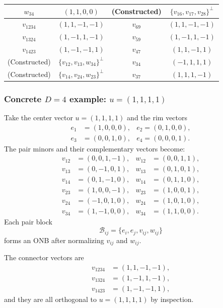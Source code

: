 \documentclass[%
  reprint,
  superscriptaddress,
  showpacs,
  showkeys,
  amsmath,amssymb,
  pra,
  longbibliography,
  floatfix,
  x11names
]{revtex4-2}
\begin{document}
\begin{table}[ht]
\begin{ruledtabular}
\begin{tabular}{cccc}
$w_{34}$ & $(1,1,0,0)$ & (Constructed) & $\{v_{16}, v_{17}, v_{28}\}^\perp$ \\
\hline
$v_{1234}$ & $(1,1,-1,-1)$ & $v_{69}$ & $(1,1,-1,-1)$ \\
$v_{1324}$ & $(1,-1,1,-1)$ & $v_{59}$ & $(1,-1,1,-1)$ \\
$v_{1423}$ & $(1,-1,-1,1)$ & $v_{47}$ & $(1,1,-1,1)$ \\
\hline
(Constructed) & $\{v_{12}, v_{13}, w_{34}\}^\perp$ & $v_{34}$ & $(-1,1,1,1)$ \\
(Constructed) & $\{v_{14}, v_{24}, w_{23}\}^\perp$ & $v_{37}$ & $(1,1,1,-1)$ \\
\end{tabular}
\end{ruledtabular}
\end{table}





\subsubsection{Concrete $D=4$ example: $u=(1,1,1,1)$}

Take the center vector $u=(1,1,1,1)$ and the rim vectors
\begin{align*}
e_1&=(1,0,0,0),& e_2 =(0,1,0,0),\\
e_3&=(0,0,1,0),& e_4 =(0,0,0,1).
\end{align*}
The pair minors and their complementary vectors become:
\begin{align*}
v_{12}&=(0,0,1,-1), & w_{12}&=(0,0,1,1),\\
v_{13}&=(0,-1,0,1), & w_{13}&=(0,1,0,1),\\
v_{14}&=(0,1,-1,0), & w_{14}&=(0,1,1,0),\\
v_{23}&=(1,0,0,-1), & w_{23}&=(1,0,0,1),\\
v_{24}&=(-1,0,1,0), & w_{24}&=(1,0,1,0),\\
v_{34}&=(1,-1,0,0), & w_{34}&=(1,1,0,0).
\end{align*}
Each pair block
\[
\mathcal{B}_{ij}=\{e_i, e_j, v_{ij}, w_{ij}\}
\]
forms an ONB after normalizing $v_{ij}$ and $w_{ij}$.

The connector vectors are
\begin{align*}
v_{1234}&=(1,1,-1,-1),\\
v_{1324}& =(1,-1,1,-1),\\
v_{1423}&=(1,-1,-1,1),
\end{align*}
and they are all orthogonal to $u=(1,1,1,1)$ by inspection.
\end{document}
